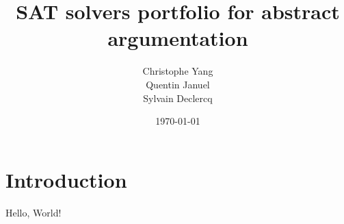 \documentclass[a4paper, 12pt]{article}
\title{SAT solvers portfolio for abstract argumentation}
\author{
    Christophe Yang \\
    Quentin Januel \\
    Sylvain Declercq
}
\date{\today}
\begin{document}
\maketitle
\newpage

\tableofcontents
\newpage

\section{Introduction}
Hello, World!
\end{document}
